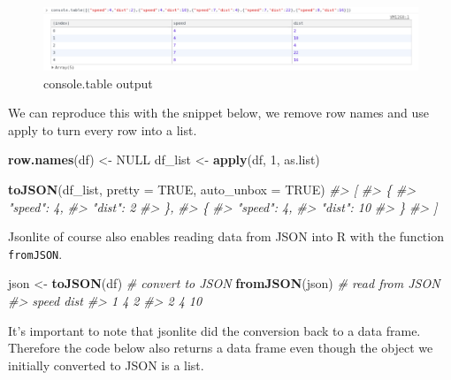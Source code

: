 \documentclass[
]{krantz}
\makeatletter
\newenvironment{Shaded}{\begin{snugshade}}{\end{snugshade}}
\newcommand{\CommentTok}[1]{\textcolor[rgb]{0.37,0.37,0.37}{\textit{#1}}}
\newcommand{\DataTypeTok}[1]{\textcolor[rgb]{0.27,0.27,0.27}{#1}}
\newcommand{\DecValTok}[1]{\textcolor[rgb]{0.06,0.06,0.06}{#1}}
\newcommand{\KeywordTok}[1]{\textcolor[rgb]{0.27,0.27,0.27}{\textbf{#1}}}
\newcommand{\NormalTok}[1]{#1}
\newcommand{\OtherTok}[1]{\textcolor[rgb]{0.37,0.37,0.37}{#1}}
\newcommand{\StringTok}[1]{\textcolor[rgb]{0.5,0.5,0.5}{#1}}
\newenvironment{kframe}{%
\medskip{}
\setlength{\fboxsep}{.8em}
 \def\at@end@of@kframe{}%
 \ifinner\ifhmode%
  \def\at@end@of@kframe{\end{minipage}}%
  \begin{minipage}{\columnwidth}%
 \fi\fi%
 \def\FrameCommand##1{\hskip\@totalleftmargin \hskip-\fboxsep
 \colorbox{shadecolor}{##1}\hskip-\fboxsep
     \hskip-\linewidth \hskip-\@totalleftmargin \hskip\columnwidth}%
 \MakeFramed {\advance\hsize-\width
   \@totalleftmargin\z@ \linewidth\hsize
   \@setminipage}}%
 {\par\unskip\endMakeFramed%
 \at@end@of@kframe}
\renewenvironment{Shaded}{\begin{kframe}}{\end{kframe}}
\makeatother
\begin{document}
\begin{figure}[t]

{\centering \includegraphics[width=1\linewidth]{images/console-table} 

}

\caption{console.table output}\label{fig:console-table}
\end{figure}

We can reproduce this with the snippet below, we remove row names and use apply to turn every row into a list.

\begin{Shaded}
\begin{Highlighting}[]
\KeywordTok{row.names}\NormalTok{(df) <{-}}\StringTok{ }\OtherTok{NULL}
\NormalTok{df\_list <{-}}\StringTok{ }\KeywordTok{apply}\NormalTok{(df, }\DecValTok{1}\NormalTok{, as.list)}

\KeywordTok{toJSON}\NormalTok{(df\_list, }\DataTypeTok{pretty =} \OtherTok{TRUE}\NormalTok{, }\DataTypeTok{auto\_unbox =} \OtherTok{TRUE}\NormalTok{)}
\CommentTok{\#> [}
\CommentTok{\#>   \{}
\CommentTok{\#>     "speed": 4,}
\CommentTok{\#>     "dist": 2}
\CommentTok{\#>   \},}
\CommentTok{\#>   \{}
\CommentTok{\#>     "speed": 4,}
\CommentTok{\#>     "dist": 10}
\CommentTok{\#>   \}}
\CommentTok{\#> ]}
\end{Highlighting}
\end{Shaded}

Jsonlite of course also enables reading data from JSON into R with the function \texttt{fromJSON}.

\begin{Shaded}
\begin{Highlighting}[]
\NormalTok{json <{-}}\StringTok{ }\KeywordTok{toJSON}\NormalTok{(df) }\CommentTok{\# convert to JSON}
\KeywordTok{fromJSON}\NormalTok{(json) }\CommentTok{\# read from JSON}
\CommentTok{\#>   speed dist}
\CommentTok{\#> 1     4    2}
\CommentTok{\#> 2     4   10}
\end{Highlighting}
\end{Shaded}

It's important to note that jsonlite did the conversion back to a data frame. Therefore the code below also returns a data frame even though the object we initially converted to JSON is a list.
\end{document}
